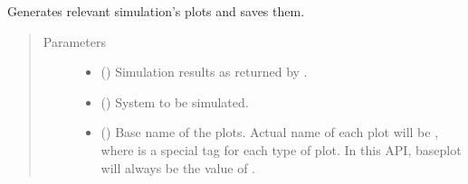 \documentclass[a4paper,landscape,10pt,english]{sphinxmanual}
\begin{document}

\begin{fulllineitems}
\label{\detokenize{code_docs/simulation_API.controller:simulation_API.controller.tasks._plot_solution}}
Generates relevant simulation’s plots and saves them.
\begin{quote}\begin{description}
\item[{Parameters}] \leavevmode\begin{itemize}
\item {} 
 ({\hyperref[\detokenize{code_docs/simulation_API.controller:simulation_API.controller.schemas.SimResults}]{}}) \textendash{} Simulation results as returned by
{\hyperref[\detokenize{code_docs/simulation_API.simulation:simulation_API.simulation.simulations.Simulation.simulate}]{}}.

\item {} 
 ({\hyperref[\detokenize{code_docs/simulation_API.controller:simulation_API.controller.schemas.SimSystem}]{}}) \textendash{} System to be simulated.

\item {} 
 () \textendash{} Base name of the plots. Actual name of each plot will be
, where 
is a special tag for each type of plot. In this API, baseplot will
always be the value of
{\hyperref[\detokenize{code_docs/simulation_API.controller:simulation_API.controller.schemas.SimIdResponse.sim_id}]{}}.


\end{itemize}
\end{description}
\end{quote}
\end{fulllineitems}
\end{document}

